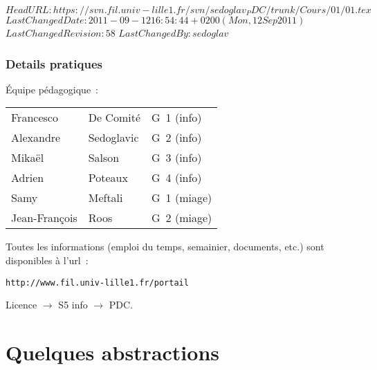 \svnidlong 
{$HeadURL: https://svn.fil.univ-lille1.fr/svn/sedoglav_PDC/trunk/Cours/01/01.tex $} 
{$LastChangedDate: 2011-09-12 16:54:44 +0200 (Mon, 12 Sep 2011) $} 
{$LastChangedRevision: 58 $} 
{$LastChangedBy: sedoglav $} 
\begin{frame}
\frametitle{Details pratiques}
  \begin{center}
    \'Equipe p\'edagogique~:
    \par\bigskip
    \begin{tabular}{lll}
      Francesco &  De Comit\'e & G~1 (info) \\
      Alexandre & Sedoglavic  & G~2 (info) \\
      Mika\"el & Salson & G~3 (info) \\
      Adrien & Poteaux & G~4 (info)\\
      Samy & Meftali & G~1 (miage) \\
      Jean-Fran\c{c}ois & Roos & G~2 (miage) \\	
   \end{tabular}
  \end{center}
    \par\medskip
    Toutes les informations (emploi du temps, semainier, documents, etc.) sont
    disponibles \`a l'url~:
    \par
    \texttt{http://www.fil.univ-lille1.fr/portail}
    \par
    \hfill Licence $\rightarrow$ S5 info $\rightarrow$ PDC.
\end{frame}
\section{Quelques abstractions}%
